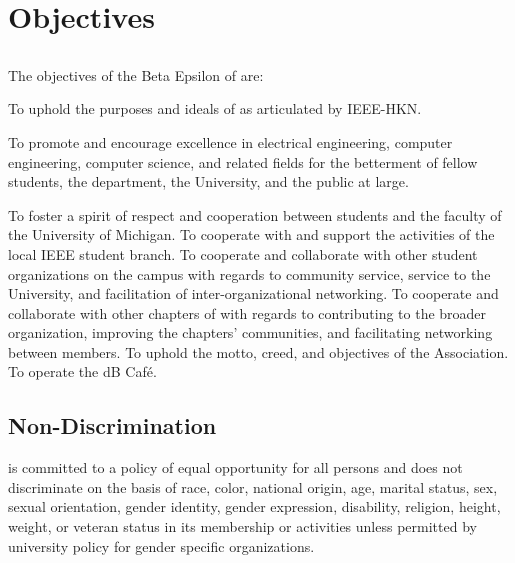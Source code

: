 \chapter{Objectives}\label{sec:objectives}
\section{}
The objectives of the Beta Epsilon of \hkn are:


\begin{enumsubsection}

\itemnotoc To uphold the purposes and ideals of \hkn as articulated by IEEE-HKN.

\itemnotoc To promote and encourage excellence in electrical engineering, computer engineering, computer science, and related fields for the betterment of fellow students, the department, the University, and the public at large.

\itemnotoc To foster a spirit of respect and cooperation between students and the faculty of the University of Michigan.
\itemnotoc To cooperate with and support the activities of the local IEEE student branch.
\itemnotoc To cooperate and collaborate with other student organizations on the campus with regards to community service, service to the University, and facilitation of inter-organizational networking.
\itemnotoc To cooperate and collaborate with other chapters of \hkn with regards to contributing to the broader organization, improving the chapters' communities, and facilitating networking between \hkn members.
\itemnotoc To uphold the motto, creed, and objectives of the Association.
\itemnotoc To operate the dB Caf\'{e}.

\end{enumsubsection}

\section{Non-Discrimination}
\hkn is committed to a policy of equal opportunity for all persons and does not discriminate on the basis of race, color, national origin, age, marital status, sex, sexual orientation, gender identity, gender expression, disability, religion, height, weight, or veteran status in its membership or activities unless permitted by university policy for gender specific organizations.

